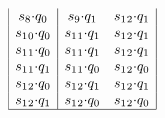 \documentclass[12pt]{article}
\begin{document}
\begin{tcolorbox}
\begin{itemize}[leftmargin=*]
$$\begin{array}{|c|cc|}
     s_8{\cdot}q_0 & s_9{\cdot}q_1 & s_1{}_2{\cdot}q_1\\
     s_1{}_0{\cdot}q_0 & s_1{}_1{\cdot}q_1 & s_1{}_2{\cdot}q_1\\
     s_1{}_1{\cdot}q_0 & s_1{}_1{\cdot}q_1 & s_1{}_2{\cdot}q_1\\
     s_1{}_1{\cdot}q_1 & s_1{}_1{\cdot}q_0 & s_1{}_2{\cdot}q_0\\
     s_1{}_2{\cdot}q_0 & s_1{}_2{\cdot}q_1 & s_1{}_2{\cdot}q_1\\
     s_1{}_2{\cdot}q_1 & s_1{}_2{\cdot}q_0 & s_1{}_2{\cdot}q_0\\
     \hline
    \end{array}$$
 \end{itemize}
\end{tcolorbox}\bigskip
\end{document}
